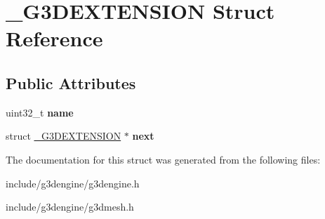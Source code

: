 \hypertarget{struct__G3DEXTENSION}{}\section{\+\_\+\+G3\+D\+E\+X\+T\+E\+N\+S\+I\+ON Struct Reference}
\label{struct__G3DEXTENSION}
\subsection*{Public Attributes}
\begin{DoxyCompactItemize}
\item 
\mbox{\label{struct__G3DEXTENSION_a3938a93d120f8eafd2c6cdcf4e9de96c}} 
uint32\+\_\+t {\bfseries name}
\item 
\mbox{\label{struct__G3DEXTENSION_af5336eec87d06f47cb0cdf443c2ad928}} 
struct \hyperlink{struct__G3DEXTENSION}{\+\_\+\+G3\+D\+E\+X\+T\+E\+N\+S\+I\+ON} $\ast$ {\bfseries next}
\end{DoxyCompactItemize}


The documentation for this struct was generated from the following files\+:\begin{DoxyCompactItemize}
\item 
include/g3dengine/g3dengine.\+h\item 
include/g3dengine/g3dmesh.\+h\end{DoxyCompactItemize}
